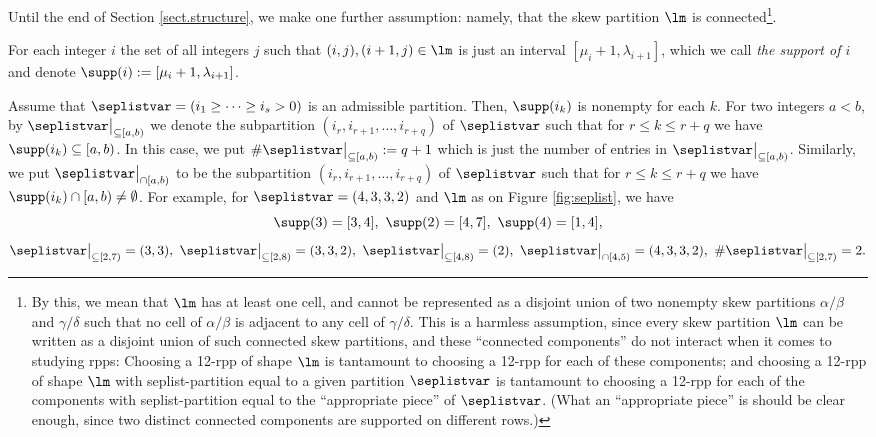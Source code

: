 \documentclass[numbers=enddot,12pt,final,onecolumn,notitlepage]{scrartcl}%
\theoremstyle{definition}
\begin{document}
Until the end of Section \ref{sect.structure}, we make one further
assumption: namely, that the skew partition $\lm$ is
connected\footnote{By this, we mean that $\lm$ has at least one
cell, and cannot be represented
as a disjoint union of two nonempty skew partitions $\alpha/\beta$
and $\gamma/\delta$ such that no cell of $\alpha/\beta$ is adjacent
to any cell of $\gamma/\delta$. This is a harmless assumption,
since every skew partition $\lm$ can be written as a disjoint union
of such connected skew partitions, and these ``connected
components'' do not interact when it comes to studying rpps:
Choosing a 12-rpp of shape $\lm$ is tantamount to choosing
a 12-rpp for each of these components; and choosing a 12-rpp of
shape $\lm$ with seplist-partition equal to a given partition
$\seplistvar$ is tantamount to choosing a 12-rpp for each of the
components with seplist-partition equal to the ``appropriate piece''
of $\seplistvar$. (What an ``appropriate piece'' is should be
clear enough, since two distinct connected components are supported
on different rows.)}.

\newcommand{\nuxy}[2]{\seplistvar\big|_{\subseteq[#1,#2)}}
\newcommand{\nuxycap}[2]{\seplistvar\big|_{\cap[#1,#2)}}
\newcommand{\nupxy}[2]{\seplistvar^{\prime}\big|_{\subseteq[#1,#2)}}

\def\nuab{\nuxy{a}{b}}
\def\nuabcap{\nuxycap{a}{b}}



For each integer $i$ the set of all integers $j$ such that $(i,j),(i+1,j)\in\lm$ is just an interval $[\mu_{i}+1,\lambda_{i+1}]$, which we call \textit{the support of $i$} and denote $\supp(i):=[\mu_{i}+1,\lambda_{i+1}]$.

Assume that $\seplistvar = \left(i_1 \geq \cdots \geq i_s > 0\right)$ is an admissible partition. Then, $\supp(i_k)$ is nonempty for each $k$. For two integers $a< b$, by $\nuab$ we denote the subpartition $(i_r,i_{r+1},\dots,i_{r+q})$ of $\seplistvar$ such that for $r\leq k\leq r+q$ we have $\supp(i_k)\subseteq [a,b)$. In this case, we put $\#\nuab:=q+1$ which is just the number of entries in $\nuab$. Similarly, we put $\nuabcap$ to be the subpartition $(i_r,i_{r+1},\dots,i_{r+q})$ of $\seplistvar$ such that for $r\leq k\leq r+q$ we have $\supp(i_k)\cap [a,b)\neq\emptyset$.
For example, for $\seplistvar=(4,3,3,2)$ and $\lm$ as on Figure \ref{fig:seplist}, we have 
$$\supp(3)=[3,4],\ \supp(2)=[4,7],\ \supp(4)=[1,4],$$ 
$$\nuxy{2}{7}=(3,3),\ \nuxy{2}{8}=(3,3,2),\ \nuxy{4}{8}=(2),\ \nuxycap{4}{5}=(4,3,3,2),\ \#\nuxy{2}{7}=2.$$
\end{document}
